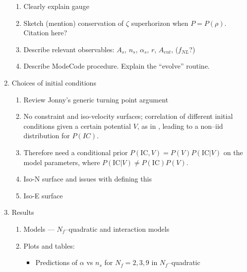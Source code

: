 \documentclass[a4paper,11pt]{article}
\begin{document}
\begin{enumerate}
\begin{enumerate}
      \item Clearly explain gauge

      \item Sketch (mention) conservation of $\zeta$ superhorizon when $P=P(\rho)$.  Citation here?

      \item Describe relevant observables: $A_s$, $n_s$, $\alpha_s$, $r$, $A_{ent}$, ($f_{NL}$?)

      \item Describe ModeCode procedure.  Explain the ``evolve'' routine.

    \end{enumerate}

  \item Choices of initial conditions

    \begin{enumerate}

      \item Review Jonny's generic turning point argument

      \item No constraint and iso-velocity surfaces; correlation of different initial conditions given a certain potential $V$, as in \cite{Easther:2013bga}, leading to a non--iid distribution for $P(IC)$.

      \item Therefore need a conditional prior $P(\mathrm{IC},V) = P(V) P(\mathrm{IC}|V)$ on the model parameters, where $P(\mathrm{IC}|V) \ne P(\mathrm{IC}) P(V)$.

      \item Iso-N surface \cite{Frazer:2013zoa} and issues with defining this

      \item Iso-E surface \cite{Easther:2013bga}


    \end{enumerate}

  \item Results

    \begin{enumerate}

      \item Models --- $N_f$--quadratic and interaction models

      \item Plots and tables:

        \begin{itemize}

          \item Predictions of $\alpha$ vs $n_s$ for $N_f=2,3,9$ in $N_f$--quadratic


\end{itemize}
\end{enumerate}
\end{enumerate}
\end{document}
